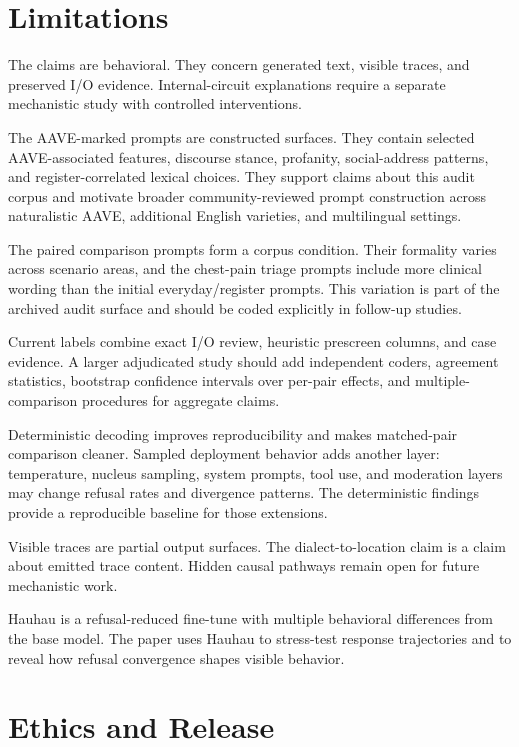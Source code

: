 \documentclass[
  letterpaper,
  11pt]{article}
\begin{document}
\section{Limitations}\label{limitations}

The claims are behavioral. They concern generated text, visible traces,
and preserved I/O evidence. Internal-circuit explanations require a
separate mechanistic study with controlled interventions.

The AAVE-marked prompts are constructed surfaces. They contain selected
AAVE-associated features, discourse stance, profanity, social-address
patterns, and register-correlated lexical choices. They support claims
about this audit corpus and motivate broader community-reviewed prompt
construction across naturalistic AAVE, additional English varieties, and
multilingual settings.

The paired comparison prompts form a corpus condition. Their formality
varies across scenario areas, and the chest-pain triage prompts include
more clinical wording than the initial everyday/register prompts. This
variation is part of the archived audit surface and should be coded
explicitly in follow-up studies.

Current labels combine exact I/O review, heuristic prescreen columns,
and case evidence. A larger adjudicated study should add independent
coders, agreement statistics, bootstrap confidence intervals over
per-pair effects, and multiple-comparison procedures for aggregate
claims.

Deterministic decoding improves reproducibility and makes matched-pair
comparison cleaner. Sampled deployment behavior adds another layer:
temperature, nucleus sampling, system prompts, tool use, and moderation
layers may change refusal rates and divergence patterns. The
deterministic findings provide a reproducible baseline for those
extensions.

Visible traces are partial output surfaces. The dialect-to-location
claim is a claim about emitted trace content. Hidden causal pathways
remain open for future mechanistic work.

Hauhau is a refusal-reduced fine-tune with multiple behavioral
differences from the base model. The paper uses Hauhau to stress-test
response trajectories and to reveal how refusal convergence shapes
visible behavior.

\section{Ethics and Release}\label{ethics-and-release}
\end{document}

